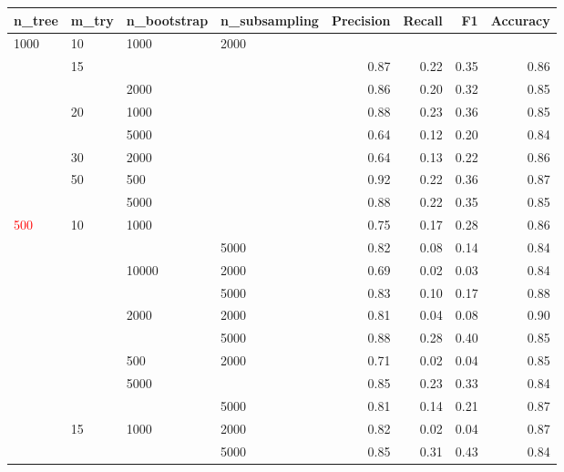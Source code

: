 \documentclass[a4paper,10pt]{article}
\begin{document}
\begin{table}[!ht]

\centering
\begin{footnotesize}
\begin{tabular}{llllrrrr}
\toprule
 n\_tree    &  m\_try  & n\_bootstrap     &  n\_subsampling    &  Precision &     Recall &         F1 &   Accuracy \\
\midrule
1000 & 10 & 1000 & 2000 &            &            &            &            \\
     & 15 &      &      &       0.87 &       0.22 &       0.35 &       0.86 \\
     &    & 2000 &      &       0.86 &       0.20 &       0.32 &       0.85 \\
     & 20 & 1000 &      &       0.88 &       0.23 &       0.36 &       0.85 \\
     &    & 5000 &      &       0.64 &       0.12 &       0.20 &       0.84 \\
     & 30 & 2000 &      &       0.64 &       0.13 &       0.22 &       0.86 \\
     & 50 & 500 &      &       0.92 &       0.22 &       0.36 &       0.87 \\
     &    & 5000 &      &       0.88 &       0.22 &       0.35 &       0.85 \\
\textcolor{red}{500} & 10 & 1000 &      &       0.75 &       0.17 &       0.28 &       0.86 \\
     &    &      & 5000 &       0.82 &       0.08 &       0.14 &       0.84 \\
     &    & 10000 & 2000 &       0.69 &       0.02 &       0.03 &       0.84 \\
     &    &      & 5000 &       0.83 &       0.10 &       0.17 &       0.88 \\
     &    & 2000 & 2000 &       0.81 &       0.04 &       0.08 &       0.90 \\
     &    &      & 5000 &       0.88 &       0.28 &       0.40 &       0.85 \\
     &    & 500 & 2000 &       0.71 &       0.02 &       0.04 &       0.85 \\
     &    & 5000 &      &       0.85 &       0.23 &       0.33 &       0.84 \\
     &    &      & 5000 &       0.81 &       0.14 &       0.21 &       0.87 \\
     & 15 & 1000 & 2000 &       0.82 &       0.02 &       0.04 &       0.87 \\
     &    &      & 5000 &       0.85 &       0.31 &       0.43 &       0.84 \\

\end{tabular}
\end{footnotesize}
\end{table}
\end{document}
